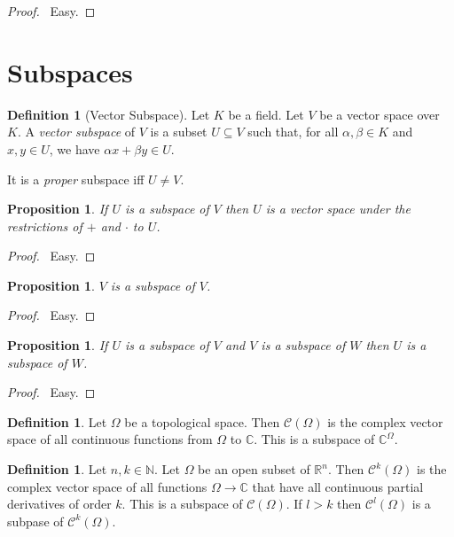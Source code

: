 \documentclass{book}
\let\qed\relax
\newtheorem{prop}[ax]{Proposition}
\theoremstyle{definition}
\newtheorem{df}[ax]{Definition}
\begin{document}
\begin{proof}
\pf\ Easy. \qed
\end{proof}

\section{Subspaces}

\begin{df}[Vector Subspace]
Let $K$ be a field. Let $V$ be a vector space over $K$. A \emph{vector subspace} of $V$ is a subset $U \subseteq V$ such that, for all $\alpha, \beta \in K$ and $x,y \in U$, we have $\alpha x + \beta y \in U$.

It is a \emph{proper} subspace iff $U \neq V$.
\end{df}

\begin{prop}
If $U$ is a subspace of $V$ then $U$ is a vector space under the restrictions of $+$ and $\cdot$ to $U$.
\end{prop}

\begin{proof}
\pf\ Easy. \qed
\end{proof}

\begin{prop}
$V$ is a subspace of $V$.
\end{prop}

\begin{proof}
\pf\ Easy. \qed
\end{proof}

\begin{prop}
If $U$ is a subspace of $V$ and $V$ is a subspace of $W$ then $U$ is a subspace of $W$.
\end{prop}

\begin{proof}
\pf\ Easy. \qed
\end{proof}

\begin{df}
Let $\Omega$ be a topological space. Then $\mathcal{C}(\Omega)$ is the complex vector space of all continuous functions from $\Omega$ to $\mathbb{C}$. This is a subspace of $\mathbb{C}^\Omega$.
\end{df}

\begin{df}
Let $n, k \in \mathbb{N}$.
Let $\Omega$ be an open subset of $\mathbb{R}^n$. Then $\mathcal{C}^k(\Omega)$ is the complex vector space of all functions $\Omega \rightarrow \mathbb{C}$ that have all continuous partial derivatives of order $k$. This is a subspace of $\mathcal{C}(\Omega)$. If $l > k$ then $\mathcal{C}^l(\Omega)$ is a subpase of $\mathcal{C}^k(\Omega)$.
\end{df}
\end{document}
